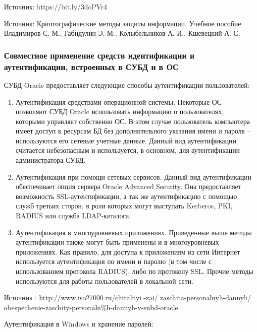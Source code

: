 Источник: https://bit.ly/3doPVr4

Источник: Криптографические методы защиты информации. Учебное пособие. Владимиров С. М., Габидулин Э. М., Колыбельников А. И., Кшевецкий А. С.
\subsubsection{Совместное применение средств идентификации и аутентификации, встроенных в СУБД и в ОС}
СУБД Oracle предоставляет следующие способы аутентификации
пользователей:
\begin{enumerate}
    \item Аутентификация средствами операционной системы. Некоторые ОС
позволяют СУБД Oracle использовать информацию о пользователях, которыми
управляет собственно ОС. В этом случае пользователь компьютера имеет доступ к
ресурсам БД без дополнительного указания имени и пароля – используются его
сетевые учетные данные. Данный вид аутентификации считается небезопасным и
используется, в основном, для аутентификации администратора СУБД.
    \item Аутентификация при помощи сетевых сервисов. Данный вид аутентификации
обеспечивает опция сервера Oracle Advanced Security. Она предоставляет
возможность SSL-аутентификации, а так же аутентификацию с помощью служб
третьих сторон, в роли которых могут выступать Kerberos, PKI, RADIUS или служба
LDAP-каталога.
    \item Аутентификация в многоуровневых приложениях. Приведенные выше
методы аутентификации также могут быть применены и в многоуровневых
приложениях. Как правило, для доступа к приложениям из сети Интернет используется аутентификация по имени и паролю (в том числе с использованием протокола
RADIUS), либо по протоколу SSL. Прочие методы используются для работы
пользователей в локальной сети.
\end{enumerate}

Источник : http://www.iso27000.ru/chitalnyi
-zai/
zaschita-personalnyh-dannyh/
obespechenie-zaschity-personaln\%h-dannyh-v-subd-oracle

Аутентификация в Windows и хранение паролей:


